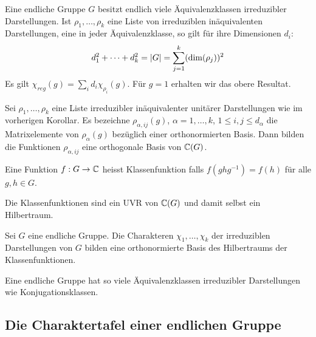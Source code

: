 \begin{korollar}
    Eine endliche Gruppe $G$ besitzt endlich viele Äquivalenzklassen irreduzibler
    Darstellungen. Ist $\rho_1,\dots,\rho_k$ eine Liste von irreduziblen
    inäquivalenten Darstellungen, eine in jeder Äquivalenzklasse, so gilt
    für ihre Dimensionen $d_i$:
    \begin{align*}
        d_1^2 + \dots + d_k^2 = \left\vert G \right\vert = \sum_{j=1}^k (\dim(\rho_j))^2
    \end{align*}
    Es gilt $\chi_{reg}(g) = \sum_i d_i \chi_{\rho_i}(g)$. Für $g=1$ erhalten
    wir das obere Resultat.
\end{korollar}

\begin{korollar}
    Sei $\rho_1,\dots,\rho_k$ eine Liste irreduzibler inäquivalenter unitärer
    Darstellungen wie im vorherigen Korollar. Es bezeichne $\rho_{\alpha,ij}(g)$,
    $\alpha = 1,\dots,k$, $1 \leq i , j \leq d_\alpha$ die Matrixelemente von
    $\rho_\alpha (g)$ bezüglich einer orthonormierten Basis. Dann bilden die
    Funktionen $\rho_{\alpha,ij}$ eine orthogonale Basis von $\mathbb{C}(G)$.
\end{korollar}

\begin{definition}[Klassenfunktion]
    Eine Funktion $f: G \rightarrow \mathbb{C}$ heisst Klassenfunktion falls
    $f(g h g^{-1}) = f(h)$ für alle $g,h \in G$.
\end{definition}

\begin{lemma}
    Die Klassenfunktionen sind ein UVR von $\mathbb{C}(G)$ und damit selbst ein
    Hilbertraum.
\end{lemma}

\begin{korollar}
    Sei $G$ eine endliche Gruppe. Die Charakteren $\chi_1,\dots,\chi_k$ der
    irreduziblen Darstellungen von $G$ bilden eine orthonormierte Basis des
    Hilbertraums der Klassenfunktionen.
\end{korollar}

\begin{korollar}
    Eine endliche Gruppe hat so viele Äquivalenzklassen irreduzibler
    Darstellungen wie Konjugationsklassen.
\end{korollar}

\subsection{Die Charaktertafel einer endlichen Gruppe}

